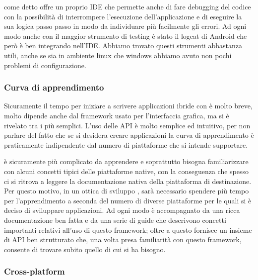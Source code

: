 		\tisdk{} come detto offre un proprio IDE che permette anche di fare 
		debugging del codice \js{} con la possibilità di interrompere 
		l'esecuzione dell'applicazione e di eseguire la sua logica passo passo 
		in modo da individuare più facilmente gli errori. Ad ogni modo anche 
		con \tisdk{} il maggior strumento di testing è stato il logcat di 
		Android che però è ben integrando nell'IDE. Abbiamo trovato 
		questi strumenti abbastanza utili, anche se sia in ambiente linux che 
		windows abbiamo avuto non pochi problemi di configurazione.  
		\subsubsection{Curva di apprendimento}
		Sicuramente il tempo per iniziare a scrivere applicazioni ibride con 
		\pg{} è molto breve, molto dipende anche dal framework usato per 
		l'interfaccia grafica, ma \kendomob{} si è rivelato tra i più semplici.
		L'uso delle API è molto semplice ed intuitivo, per non parlare del 
		fatto che se si desidera creare applicazioni \crossplat{} la curva di 
		apprendimento è praticamente indipendente dal numero di piattaforme 
		che si intende supportare.
		
		\tisdk{} è sicuramente più complicato da apprendere e soprattutto 
		bisogna familiarizzare con alcuni concetti tipici delle piattaforme 
		native, con la conseguenza che spesso ci si ritrova a leggere la 
		documentazione nativa della piattaforma di destinazione. Per
        questo motivo, in un ottica di sviluppo \crossplat{}, sarà necessario
        spendere più tempo per l'apprendimento a seconda del numero di diverse
        piattaforme per le quali si è deciso di sviluppare applicazioni. Ad
        ogni modo \tisdk{} è accompagnato da una ricca documentazione ben
        fatta e da una serie di guide che descrivono concetti
        importanti relativi all'uso di questo framework; oltre a questo
        \tisdk{} fornisce un insieme di API ben strutturato che, una volta
        presa familiarità con questo framework, consente di trovare subito
        quello di cui si ha bisogno.
		\subsubsection{Cross-platform}

